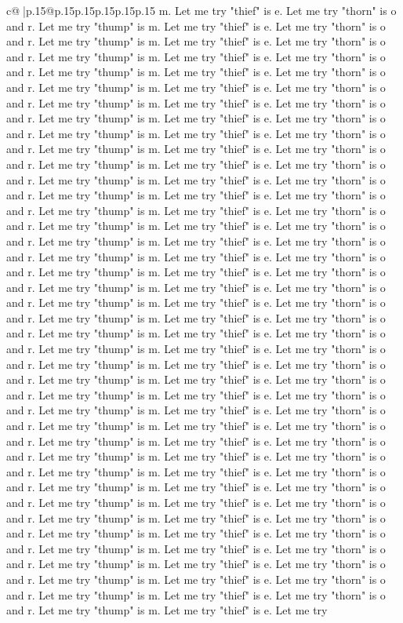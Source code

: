 \documentclass{article}
\begin{document}
{\begin{supertabular}{c@{$\;$}|p{.15\linewidth}@{}p{.15\linewidth}p{.15\linewidth}p{.15\linewidth}p{.15\linewidth}p{.15\linewidth}}
{{{m. Let me try "thief" is e. Let me try "thorn" is o and r. Let me try "thump" is m. Let me try "thief" is e. Let me try "thorn" is o and r. Let me try "thump" is m. Let me try "thief" is e. Let me try "thorn" is o and r. Let me try "thump" is m. Let me try "thief" is e. Let me try "thorn" is o and r. Let me try "thump" is m. Let me try "thief" is e. Let me try "thorn" is o and r. Let me try "thump" is m. Let me try "thief" is e. Let me try "thorn" is o and r. Let me try "thump" is m. Let me try "thief" is e. Let me try "thorn" is o and r. Let me try "thump" is m. Let me try "thief" is e. Let me try "thorn" is o and r. Let me try "thump" is m. Let me try "thief" is e. Let me try "thorn" is o and r. Let me try "thump" is m. Let me try "thief" is e. Let me try "thorn" is o and r. Let me try "thump" is m. Let me try "thief" is e. Let me try "thorn" is o and r. Let me try "thump" is m. Let me try "thief" is e. Let me try "thorn" is o and r. Let me try "thump" is m. Let me try "thief" is e. Let me try "thorn" is o and r. Let me try "thump" is m. Let me try "thief" is e. Let me try "thorn" is o and r. Let me try "thump" is m. Let me try "thief" is e. Let me try "thorn" is o and r. Let me try "thump" is m. Let me try "thief" is e. Let me try "thorn" is o and r. Let me try "thump" is m. Let me try "thief" is e. Let me try "thorn" is o and r. Let me try "thump" is m. Let me try "thief" is e. Let me try "thorn" is o and r. Let me try "thump" is m. Let me try "thief" is e. Let me try "thorn" is o and r. Let me try "thump" is m. Let me try "thief" is e. Let me try "thorn" is o and r. Let me try "thump" is m. Let me try "thief" is e. Let me try "thorn" is o and r. Let me try "thump" is m. Let me try "thief" is e. Let me try "thorn" is o and r. Let me try "thump" is m. Let me try "thief" is e. Let me try "thorn" is o and r. Let me try "thump" is m. Let me try "thief" is e. Let me try "thorn" is o and r. Let me try "thump" is m. Let me try "thief" is e. Let me try "thorn" is o and r. Let me try "thump" is m. Let me try "thief" is e. Let me try "thorn" is o and r. Let me try "thump" is m. Let me try "thief" is e. Let me try "thorn" is o and r. Let me try "thump" is m. Let me try "thief" is e. Let me try "thorn" is o and r. Let me try "thump" is m. Let me try "thief" is e. Let me try "thorn" is o and r. Let me try "thump" is m. Let me try "thief" is e. Let me try "thorn" is o and r. Let me try "thump" is m. Let me try "thief" is e. Let me try "thorn" is o and r. Let me try "thump" is m. Let me try "thief" is e. Let me try "thorn" is o and r. Let me try "thump" is m. Let me try "thief" is e. Let me try "thorn" is o and r. Let me try "thump" is m. Let me try "thief" is e. Let me try "thorn" is o and r. Let me try "thump" is m. Let me try "thief" is e. Let me try "thorn" is o and r. Let me try "thump" is m. Let me try "thief" is e. Let me try "thorn" is o and r. Let me try "thump" is m. Let me try "thief" is e. Let me try "thorn" is o and r. Let me try "thump" is m. Let me try "thief" is e. Let me try "thorn" is o and r. Let me try "thump" is m. Let me try "thief" is e. Let me try "thorn" is o and r. Let me try "thump" is m. Let me try "thief" is e. Let me try }}}
\end{supertabular}}
\end{document}
